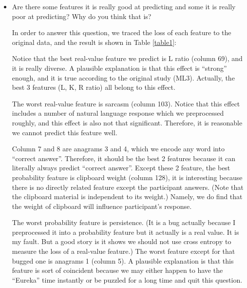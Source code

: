 \documentclass[11pt, a4paper]{article}
\begin{document}
\begin{enumerate}
\begin{itemize}
		
		\item {Are there some features it is really good at predicting and some it is really poor at predicting? Why do you think that is?}
		\par{In order to answer this question, we traced the loss of each feature to the original data, and the result is shown in Table \ref{table1}: }
		\par{Notice that the best real-value feature we predict is L ratio (column 69), and it is really diverse. A plausible explanation is that this effect is ``strong'' enough, and it is true according to the original study (ML3). Actually, the best 3 features (L, K, R ratio) all belong to this effect.}
		\par{The worst real-value feature is sarcasm (column 103). Notice that this effect includes a number of natural language response which we preprocessed roughly, and this effect is also not that significant. Therefore, it is reasonable we cannot predict this feature well.}
		\par{Column 7 and 8 are anagrams 3 and 4, which we encode any word into ``correct answer''. Therefore, it should be the best 2 features because it can literally always predict ``correct answer''. Except these 2 feature, the best probability feature is clipboard weight (column 128), it is interesting because there is no directly related feature except the participant answers. (Note that the clipboard material is independent to its weight.) Namely, we do find that the weight of clipboard will influence participant’s response.}
		\par{The worst probability feature is persistence. (It is a bug actually because I preprocessed it into a probability feature but it actually is a real value. It is my fault. But a good story is it shows we should not use cross entropy to measure the loss of a real-value feature.) The worst feature except for that bugged one is anagrams 1 (column 5). A plausible explanation is that this feature is sort of coincident because we may either happen to have the ``Eureka'' time instantly or be puzzled for a long time and quit this question.}
	\end{itemize}
	

\end{enumerate}
\end{document}
